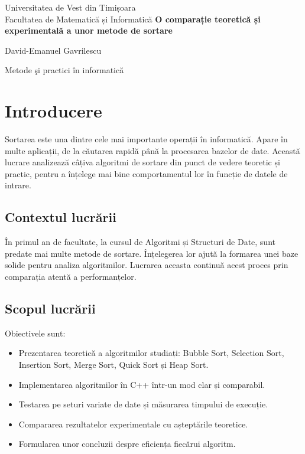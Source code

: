 \documentclass{article}
\begin{document}

\begin{titlepage}
  \begin{center}
    {\large Universitatea de Vest din Timișoara \\
    Facultatea de Matematică și Informatică}
    \vfill
    {\huge \bfseries O comparație teoretică și experimentală a unor metode de sortare}\par
    \vspace{2cm}
    {\Large David-Emanuel Gavrilescu}\par   
    \vfill
    {\Large Metode şi practici în informatică}\par
  \end{center}
\end{titlepage}

\tableofcontents
\newpage


\section{Introducere}
Sortarea este una dintre cele mai importante operații în informatică. Apare în multe aplicații, de la căutarea rapidă până la procesarea bazelor de date. Această lucrare analizează câțiva algoritmi de sortare din punct de vedere teoretic și practic, pentru a înțelege mai bine comportamentul lor în funcție de datele de intrare.

\subsection{Contextul lucrării}
În primul an de facultate, la cursul de Algoritmi și Structuri de Date, sunt predate mai multe metode de sortare. Înțelegerea lor ajută la formarea unei baze solide pentru analiza algoritmilor. Lucrarea aceasta continuă acest proces prin comparația atentă a performanțelor.

\subsection{Scopul lucrării}
Obiectivele sunt:
\begin{itemize}
    \item Prezentarea teoretică a algoritmilor studiați: Bubble Sort, Selection Sort, Insertion Sort, Merge Sort, Quick Sort și Heap Sort.
    \item Implementarea algoritmilor în C++ într-un mod clar și comparabil.
    \item Testarea pe seturi variate de date și măsurarea timpului de execuție.
    \item Compararea rezultatelor experimentale cu așteptările teoretice.
    \item Formularea unor concluzii despre eficiența fiecărui algoritm.
\end{itemize}
\end{document}
